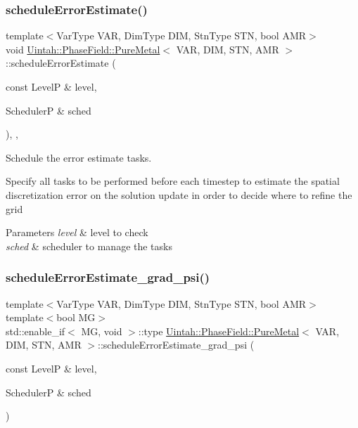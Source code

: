 \subsubsection{\texorpdfstring{schedule\+Error\+Estimate()}{scheduleErrorEstimate()}}
{\footnotesize\ttfamily template$<$Var\+Type V\+AR, Dim\+Type D\+IM, Stn\+Type S\+TN, bool A\+MR$>$ \\
void \hyperlink{classUintah_1_1PhaseField_1_1PureMetal}{Uintah\+::\+Phase\+Field\+::\+Pure\+Metal}$<$ V\+AR, D\+IM, S\+TN, A\+MR $>$\+::schedule\+Error\+Estimate (\begin{DoxyParamCaption}\item[{const LevelP \&}]{level,  }\item[{SchedulerP \&}]{sched }\end{DoxyParamCaption})\hspace{0.3cm}{\ttfamily [override]}, {\ttfamily [protected]}, {\ttfamily [virtual]}}



Schedule the error estimate tasks. 

Specify all tasks to be performed before each timestep to estimate the spatial discretization error on the solution update in order to decide where to refine the grid


\begin{DoxyParams}{Parameters}
{\em level} & level to check \\
\hline
{\em sched} & scheduler to manage the tasks \\
\hline
\end{DoxyParams}
\mbox{\label{classUintah_1_1PhaseField_1_1PureMetal_a77fe2fdf1de3522b5eae6e25bde0f78c}} 
\subsubsection{\texorpdfstring{schedule\+Error\+Estimate\+\_\+grad\+\_\+psi()}{scheduleErrorEstimate\_grad\_psi()}\hspace{0.1cm}{\footnotesize\ttfamily [1/2]}}
{\footnotesize\ttfamily template$<$Var\+Type V\+AR, Dim\+Type D\+IM, Stn\+Type S\+TN, bool A\+MR$>$ \\
template$<$bool MG$>$ \\
std\+::enable\+\_\+if$<$ MG, void $>$\+::type \hyperlink{classUintah_1_1PhaseField_1_1PureMetal}{Uintah\+::\+Phase\+Field\+::\+Pure\+Metal}$<$ V\+AR, D\+IM, S\+TN, A\+MR $>$\+::schedule\+Error\+Estimate\+\_\+grad\+\_\+psi (\begin{DoxyParamCaption}\item[{const LevelP \&}]{level,  }\item[{SchedulerP \&}]{sched }\end{DoxyParamCaption})\hspace{0.3cm}{\ttfamily [protected]}}




